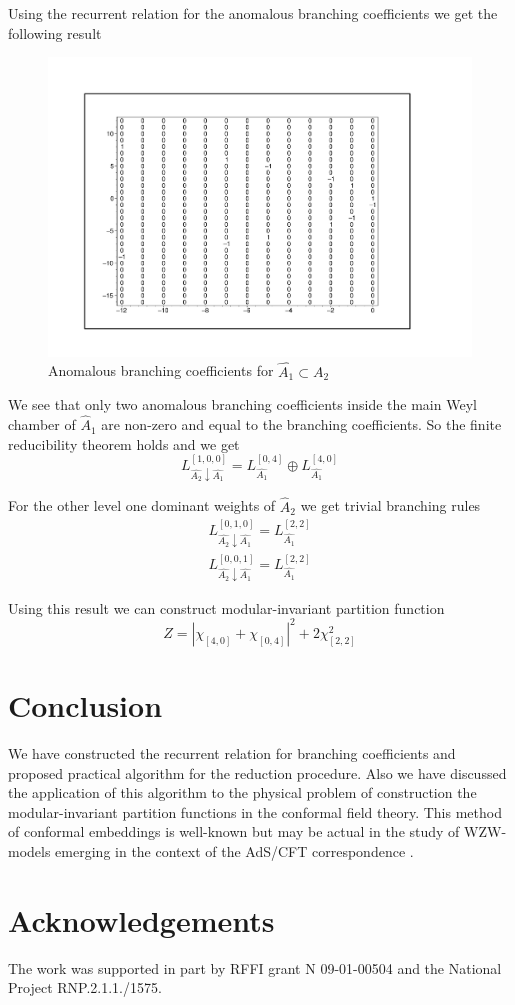 \documentclass[a4paper,12pt]{article}
\theoremstyle{definition} \newtheorem{Def}{Definition}
\begin{document}
Using the recurrent relation for the anomalous branching coefficients we get the following result
\begin{figure}[p]
  \centering
  \includegraphics[width=130mm]{AffineA2_A1_branching.pdf}
  \caption{Anomalous branching coefficients for $\hat{A_1}\subset \hat{A_2}$}
  \label{fig:AffineA2_A1_branching}
\end{figure}

We see that only two anomalous branching coefficients inside the main
Weyl chamber of $\hat{A}_1$ are non-zero and equal to the branching
coefficients. So the finite reducibility theorem holds and we get
\begin{equation}
  \label{eq:43}
  L^{[1,0,0]}_{\hat{A_2}\downarrow \hat{A_1}}= L_{\hat{A_1}}^{[0,4]}\oplus L_{\hat{A_1}}^{[4,0]}
\end{equation}

For the other level one dominant weights of $\hat{A}_2$ we get trivial
branching rules
\begin{eqnarray}
  \label{eq:44}
   L^{[0,1,0]}_{\hat{A_2}\downarrow \hat{A_1}}= L_{\hat{A_1}}^{[2,2]}\\
   L^{[0,0,1]}_{\hat{A_2}\downarrow \hat{A_1}}= L_{\hat{A_1}}^{[2,2]}
\end{eqnarray}

Using this result we can construct modular-invariant partition function
\begin{equation}
  \label{eq:45}
  Z=\left|\chi_{[4,0]}+\chi_{[0,4]}\right|^2+2\chi_{[2,2]}^2
\end{equation}

\section{Conclusion}
\label{sec:conclusion}
We have constructed the recurrent relation for branching coefficients and proposed practical algorithm for the reduction procedure. Also we have discussed the application of this algorithm to the physical problem of construction the modular-invariant partition functions in the conformal field theory. This method of conformal embeddings is well-known but may be actual in the study of WZW-models emerging in the context of the AdS/CFT correspondence \cite{Maldacena:2000hw,Maldacena:2000kv,Maldacena:2001km}.


\section{Acknowledgements}
The work was supported in
part by RFFI grant N 09-01-00504 and the National Project RNP.2.1.1./1575.

{}

\end{document}

